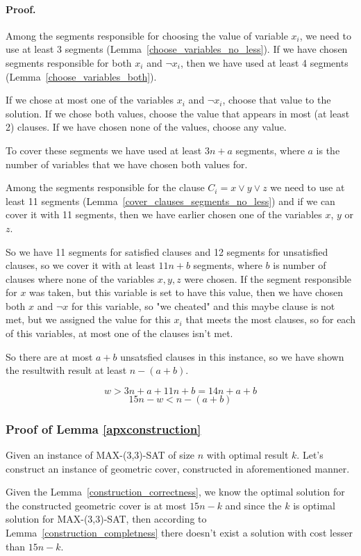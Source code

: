 \paragraph{Proof.}
Among the segments responsible for choosing the value of variable $x_i$,
we need to use at least 3 segments (Lemma~\ref{choose_variables_no_less}).
If we have chosen segments responsible for both $x_i$ and $\neg x_i$,
then we have used at least 4 segments (Lemma~\ref{choose_variables_both}).

If we chose at most one of the variables $x_i$ and $\neg x_i$,
choose that value to the solution. If we chose both values,
choose the value that appears in most (at least 2) clauses.
If we have chosen none of the values, choose any value.

To cover these segments we have used at least $3n + a$ segments,
where $a$ is the number of variables that we have chosen both
values for.

Among the segments responsible for the clause $C_i = x \lor y \lor z$
we need to use at least 11 segments
(Lemma~\ref{cover_clauses_segments_no_less})
and if we can cover it with 11 segments, then we have 
earlier chosen
one of the variables $x$, $y$ or $z$.

So we have 11 segments for satisfied clauses and 12 segments
for unsatisfied clauses, so we cover it with 
at least $11n + b$ segments, where $b$ is number of clauses
where none of the variables $x, y, z$ were chosen.
If the segment responsible for $x$ was taken,
but this variable is set to have this value,
then we have chosen both $x$ and $\neg x$ for this variable,
so "we cheated" and this maybe clause is not met,
but we assigned the value for this $x_i$ that meets
the most clauses, so for each of this variables,
at most one of the clauses isn't met.

So there are at most $a+b$ unsatsfied clauses in this instance,
so we have shown the resultwith result at least $n-(a+b)$.

$$w > 3n + a + 11n + b = 14n + a + b$$
$$15n - w < n - (a+b)$$

\subsubsection{Proof of Lemma \ref{apxconstruction}}
Given an instance of MAX-(3,3)-SAT of size $n$
with optimal result $k$.
Let's construct an instance of geometric cover,
constructed in aforementioned manner.

Given the Lemma~\ref{construction_correctness}, we know
the optimal solution for the constructed geometric cover is
at most $15n - k$ and since the $k$ is optimal solution
for MAX-(3,3)-SAT, then according to Lemma~\ref{construction_completness}
there doesn't exist a solution with cost lesser than $15n - k$.
